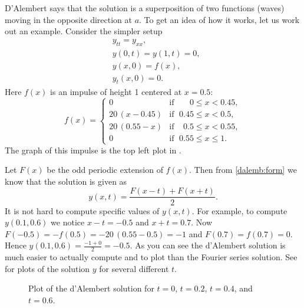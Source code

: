 \documentclass[12pt]{book}
\begin{document}
\begin{example}
D'Alembert says that the solution is a superposition of
two functions (waves) moving in the opposite direction at  $a$.
To get an idea of
how it works, let us work out an example.  Consider the simpler setup
\begin{align*}
& y_{tt} = y_{xx} , \\
& y(0,t) = y(1,t) = 0 , \\
& y(x,0) = f(x) , \\
& y_t(x,0) = 0 .
\end{align*}
Here $f(x)$ is an impulse of height 1 centered at $x=0.5$:
\begin{equation*}
f(x) =
\begin{cases}
0 & \text{if } \; \phantom{0.5}0 \leq x < 0.45, \\
20\,(x-0.45) & \text{if } \; 0.45 \leq x < 0.5, \\
20\,(0.55-x) & \text{if } \; \phantom{5}0.5 \leq x < 0.55, \\
0 & \text{if } \; 0.55 \leq x \leq 1 .
\end{cases}
\end{equation*}
The graph of this impulse is the top left plot in
.

Let $F(x)$ be the odd periodic extension of $f(x)$.  Then from
\eqref{dalemb:form} we know that
the solution is given as
\begin{equation*}
y(x,t) = \frac{F(x-t) + F(x+t)}{2} .
\end{equation*}
It is not hard to compute specific values of $y(x,t)$.  For example, to
compute $y(0.1,0.6)$ we notice $x-t = -0.5$ and $x+t = 0.7$.  Now $F(-0.5) =
-f(0.5) = - 20\,(0.55 - 0.5) = -1$
and $F(0.7) = f(0.7) = 0$.  Hence
$y(0.1,0.6) = \frac{-1 + 0}{2} = -0.5$.  As you can see the d'Alembert
solution is much easier to actually compute and to plot than the Fourier series
solution.  See  for plots of the solution $y$
for several different $t$.
\begin{figure}[h!t]
\capstart
\begin{center}
\noindent
%
\quad%
\par
\smallskip
\par
\noindent
{}%
\quad%
\caption{Plot of the d'Alembert solution for $t=0$, $t=0.2$, $t=0.4$, and
$t=0.6$.%
\label{dalemb:impulsfig}}
\end{center}
\end{figure}
\end{example}
\end{document}
